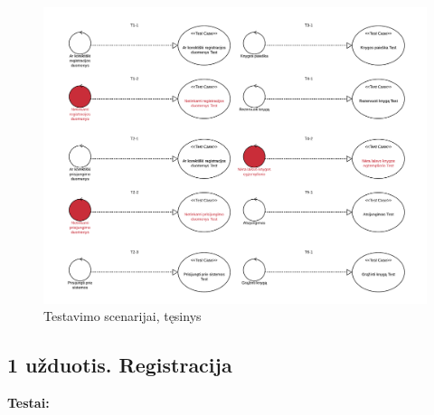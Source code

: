 \documentclass{VUMIFPSkursinis}
\begin{document}
\begin{figure}[H]
    \label{fig:testavimoscenarijai2}
    \centering
    \includegraphics[page = 2, width=1.1 \textwidth]{Testavimo_Scenarijai/TestavimoScenarijai}
    \caption{Testavimo scenarijai, tęsinys}
\end{figure}

\subsection*{1 užduotis. Registracija}
\textbf{Testai:}
\end{document}
